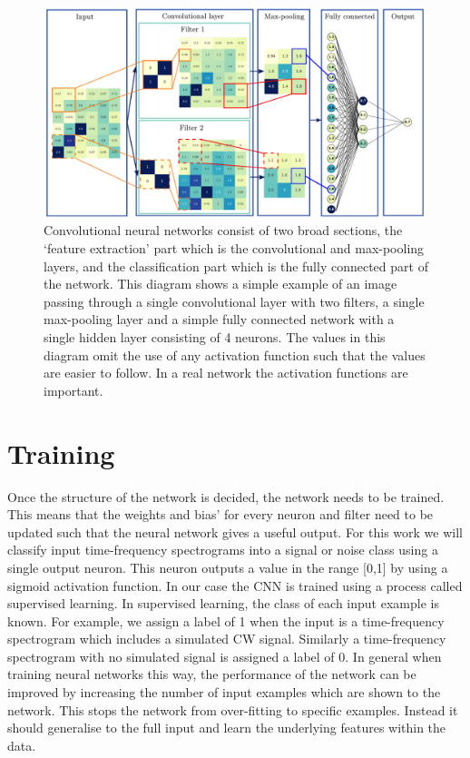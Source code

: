 \begin{figure}
	\includegraphics[width=\textwidth]{C4_cnn/cnn_structure_ex.pdf}
	\caption[Structure of \glspl{CNN}.]{Convolutional neural networks consist of two broad sections, the `feature extraction' part which is the convolutional and max-pooling layers, and the classification part which is the fully connected part of the network. This diagram shows a simple example of an image passing through a single convolutional layer with two filters, a single max-pooling layer and a simple fully connected network with a single hidden layer consisting of 4 neurons. The values in this diagram omit the use of any activation function such that the values are easier to follow. In a real network the activation functions are important.}
	\label{machine:cnn:structure:example}
\end{figure}


\section{\label{machine:training}Training}

%
Once the structure of the network is decided, the network needs to be trained.
This means that the weights and bias' for every neuron and filter need to be updated such
that the neural network gives a useful output. For this
work we will classify input time-frequency spectrograms into a signal or noise class using a single output neuron.
This neuron outputs a value in the range [0,1] by using a sigmoid activation function.
In our case the \gls{CNN} is trained using a process called supervised learning. 
In supervised learning, the class of each input example is known. For example, we assign a label of 1 when the
input is a time-frequency spectrogram which includes a simulated \gls{CW}
signal. Similarly a time-frequency spectrogram with no simulated signal is assigned a label of 0. 
In general when training neural networks this way, the performance of the network can be improved by increasing the number of input examples which are shown to the network.
This stops the network from over-fitting to specific examples. Instead it should generalise to the full input and learn the underlying features within the data.

